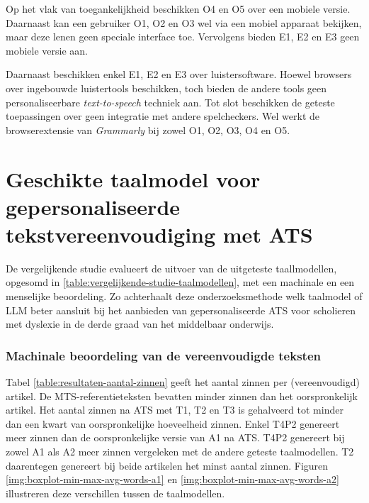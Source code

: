 Op het vlak van toegankelijkheid beschikken O4 en O5 over een mobiele versie. Daarnaast kan een gebruiker O1, O2 en O3 wel via een mobiel apparaat bekijken, maar deze lenen geen speciale interface toe. Vervolgens bieden E1, E2 en E3 geen mobiele versie aan. 

\medspace

Daarnaast beschikken enkel E1, E2 en E3 over luistersoftware. Hoewel browsers over ingebouwde luistertools beschikken, toch bieden de andere tools geen personaliseerbare \textit{text-to-speech} techniek aan. Tot slot beschikken de geteste toepassingen over geen integratie met andere spelcheckers. Wel werkt de browserextensie van \textit{Grammarly} bij zowel O1, O2, O3, O4 en O5. 

\section{Geschikte taalmodel voor gepersonaliseerde tekstvereenvoudiging met ATS}

De vergelijkende studie evalueert de uitvoer van de uitgeteste taallmodellen, opgesomd in \ref{table:vergelijkende-studie-taalmodellen}, met een machinale en een menselijke beoordeling. Zo achterhaalt deze onderzoeksmethode welk taalmodel of LLM beter aansluit bij het aanbieden van gepersonaliseerde ATS voor scholieren met dyslexie in de derde graad van het middelbaar onderwijs. 

\subsubsection{Machinale beoordeling van de vereenvoudigde teksten}

Tabel \ref{table:resultaten-aantal-zinnen} geeft het aantal zinnen per (vereenvoudigd) artikel. De MTS-referentieteksten bevatten minder zinnen dan het oorspronkelijk artikel. Het aantal zinnen na ATS met T1, T2 en T3 is gehalveerd tot minder dan een kwart van oorspronkelijke hoeveelheid zinnen. Enkel T4P2 genereert meer zinnen dan de oorspronkelijke versie van A1 na ATS. T4P2 genereert bij zowel A1 als A2 meer zinnen vergeleken met de andere geteste taalmodellen. T2 daarentegen genereert bij beide artikelen het minst aantal zinnen. Figuren \ref{img:boxplot-min-max-avg-words-a1} en \ref{img:boxplot-min-max-avg-words-a2} illustreren deze verschillen tussen de taalmodellen.

